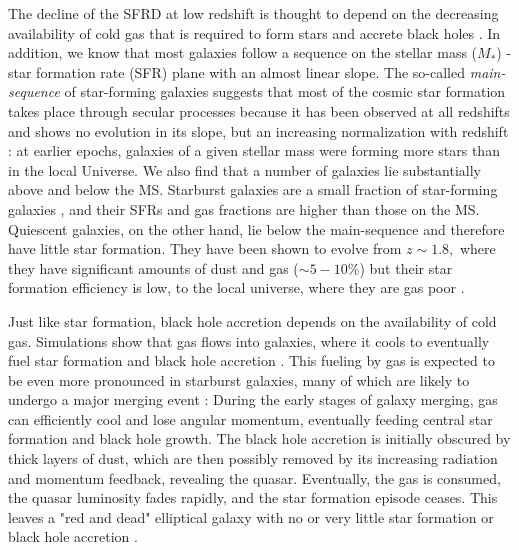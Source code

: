     The decline of the SFRD at low redshift is thought to depend on the decreasing availability of cold gas that is required to form stars and accrete black holes \citep[e.g.,][]{2016MNRAS.458L..14F}. In addition, we know that most galaxies follow a sequence on the stellar mass ($M_*$) - star formation rate (SFR) plane with an almost linear slope. The so-called \emph{\textup{main-sequence}} of star-forming galaxies \citep{2004MNRAS.351.1151B, 2007ApJ...670..156D, 2007A&A...468...33E, 2007ApJ...660L..43N, 2014MNRAS.443...19R, 2017MNRAS.465.3390A} suggests that most of the cosmic star formation takes place through secular processes \citep{2011ApJ...739L..40R} because it has been observed at all redshifts and shows no evolution in its slope, but an increasing normalization with redshift \citep{2015A&A...581A..54T, 2015A&A...575A..74S, 2016ApJ...817..118T}: at earlier epochs, galaxies of a given stellar mass were forming more stars than in the local Universe.
    We also find that a number of galaxies lie substantially above and below the MS.
    Starburst galaxies are a small fraction of star-forming galaxies \citep[$\sim2\%$][]{2011ApJ...739L..40R}, and their SFRs and gas fractions are higher than those on the MS. 
    Quiescent galaxies, on the other hand, lie below the main-sequence and therefore have little star formation. They have been shown to evolve from $z\sim1.8,$ where they have significant amounts of dust and gas ($\sim5-10\%$) but their star formation efficiency is low, to the local universe, where they are gas poor \citep{2018NatAs...2..239G}.
    
    Just like star formation, black hole accretion depends on the availability of cold gas. Simulations show that gas flows into galaxies, where it cools to eventually fuel star formation and black hole accretion \citep{2010MNRAS.407.1529H}. This fueling by gas is expected to be even more pronounced in starburst galaxies, many of which are likely to undergo a major merging event \citep{2005Natur.433..604D, 2008ApJS..175..356H}: During the early stages of galaxy merging, gas can efficiently cool and lose angular momentum, eventually feeding central star formation and black hole growth. 
    The black hole accretion is initially obscured by thick layers of dust, which are then possibly removed by its increasing radiation and momentum feedback, revealing the quasar. Eventually, the gas is consumed, the quasar luminosity fades rapidly, and the star formation episode ceases. This leaves a "red and dead" elliptical galaxy with no or very little star formation or black hole accretion \citep{2004ApJ...600..580G, 2006ApJ...650...42L}.
    
